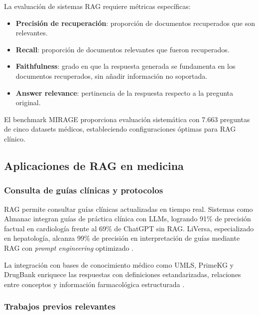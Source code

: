 La evaluación de sistemas \ac{RAG} requiere métricas específicas:

\begin{itemize}[nosep, leftmargin=*]
    \item \textbf{Precisión de recuperación}: proporción de documentos recuperados que son relevantes.
    \item \textbf{Recall}: proporción de documentos relevantes que fueron recuperados.
    \item \textbf{Faithfulness}: grado en que la respuesta generada se fundamenta en los documentos recuperados, sin añadir información no soportada.
    \item \textbf{Answer relevance}: pertinencia de la respuesta respecto a la pregunta original.
\end{itemize}

El benchmark MIRAGE \parencite{xiong2024medrag} proporciona evaluación sistemática con 7.663 preguntas de cinco datasets médicos, estableciendo configuraciones óptimas para \ac{RAG} clínico.

\subsection{Aplicaciones de \acs{RAG} en medicina}
\label{subsec:aplicaciones_rag}

\subsubsection{Consulta de guías clínicas y protocolos}

\ac{RAG} permite consultar guías clínicas actualizadas en tiempo real. Sistemas como Almanac \parencite{zakka2024almanac} integran guías de práctica clínica con \ac{LLM}s, logrando 91\% de precisión factual en cardiología frente al 69\% de ChatGPT sin \ac{RAG}. LiVersa, especializado en hepatología, alcanza 99\% de precisión en interpretación de guías mediante \ac{RAG} con \textit{prompt engineering} optimizado \parencite{kresevic2024liversa}.

La integración con bases de conocimiento médico como \ac{UMLS}, PrimeKG y DrugBank enriquece las respuestas con definiciones estandarizadas, relaciones entre conceptos y información farmacológica estructurada \parencite{zhu2024emerge}.

\subsubsection{Trabajos previos relevantes}

